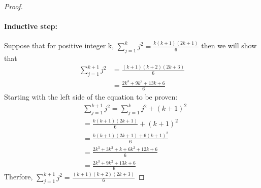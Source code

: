 \documentclass[11pt, letterpaper, twocolumn, fleqn]{article}
\begin{document}
\begin{enumerate}
\begin{proof}
              \item \paragraph{Inductive step:} Suppose that for positive integer k, $\sum_{j=1}^{k} j^2 = \frac{k(k+1)(2k+1)}{6}$ then we will show that 
              \begin{align*}
               \sum_{j=1}^{k+1} j^2 &= \frac{(k+1)(k+2)(2k+3)}{6} \\
               &= \frac{2k^3+9k^2+13k+6}{6}
              \end{align*}
              Starting with the left side of the equation to be proven:
              \begin{align*}
               &\sum_{j=1}^{k+1} j^2 = \sum_{j=1}^{k} j^2 + (k+1)^2 \tag{Separate last term}\\
               &= \frac{k(k+1)(2k+1)}{6} + (k+1)^2 \tag{Inductive hypothesis} \\
               &= \frac{k(k+1)(2k+1) + 6(k+1)^2}{6} \\
               &= \frac{2k^3+3k^2+k + 6k^2+12k+6}{6} \\
               &= \frac{2k^3+9k^2+13k+6}{6}
              \end{align*}
              Therfore, $\sum_{j=1}^{k+1} j^2 = \frac{(k+1)(k+2)(2k+3)}{6}$
             \end{proof}
        \end{enumerate}
        
\end{document}
